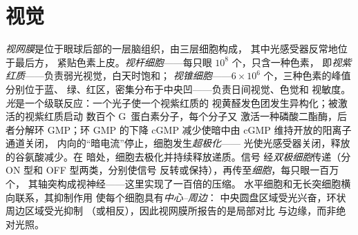 \section{视觉}

\begin{definition}[视网膜]\label{def:b3:sensory-systems:retina}
\emph{视网膜}是位于眼球后部的一层脑组织，由三层细胞构成，
其中光感受器反常地位于最后方，
紧贴色素上皮。\emph{视杆细胞}——每只眼 $10^{8}$ 个，只含一种色素，
即\emph{视紫红质}——负责弱光视觉，白天时饱和；
\emph{视锥细胞}——$6\times 10^{6}$ 个，三种色素的峰值分别位于蓝、
绿、红区，密集分布于中央凹——负责日间视觉、色觉和
视敏度。\emph{光}是一个级联反应：一个光子使一个视紫红质的
视黄醛发色团发生异构化；被激活的视紫红质启动
数百个 G~蛋白素分子，每个分子又
激活一种磷酸二酯酶，后者分解环 GMP；环 GMP 的下降
cGMP 减少使暗中由 cGMP 维持开放的阳离子通道关闭，
内向的“暗电流”停止，细胞发生\emph{超极化}——
光使光感受器关闭，释放的谷氨酸减少。在
暗处，细胞去极化并持续释放递质。信号
经\emph{双极细胞}传递（分 ON 型和 OFF 型两类，分别使信号
反转或保持），再传至\emph{细胞}，每只眼一百万个，
其轴突构成视神经——这里实现了一百倍的压缩。
水平细胞和无长突细胞横向联系，其抑制作用
使每个细胞具有\emph{中心–周边}：
中央圆盘区域受光兴奋，环状周边区域受光抑制
（或相反），因此视网膜所报告的是局部对比
与边缘，而非绝对光照。
\end{definition}

